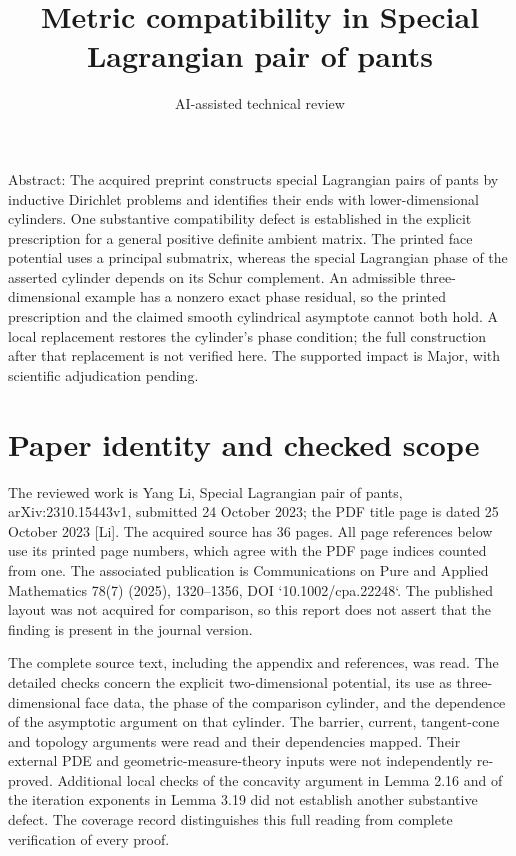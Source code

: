 \documentclass[10pt]{article}
\title{Metric compatibility in
Special Lagrangian pair of pants}
\author{AI-assisted technical review}
\date{}
\begin{document}
\maketitle
Abstract: The acquired preprint constructs special Lagrangian pairs of pants by inductive Dirichlet problems and identifies their ends with lower-dimensional cylinders. One substantive compatibility defect is established in the explicit prescription for a general positive definite ambient matrix. The printed face potential uses a principal submatrix, whereas the special Lagrangian phase of the asserted cylinder depends on its Schur complement. An admissible three-dimensional example has a nonzero exact phase residual, so the printed prescription and the claimed smooth cylindrical asymptote cannot both hold. A local replacement restores the cylinder’s phase condition; the full construction after that replacement is not verified here. The supported impact is Major, with scientific adjudication pending.\par
\section*{Paper identity and checked scope}
The reviewed work is Yang Li, Special Lagrangian pair of pants, arXiv:2310.15443v1, submitted 24 October 2023; the PDF title page is dated 25 October 2023 [Li]. The acquired source has 36 pages. All page references below use its printed page numbers, which agree with the PDF page indices counted from one. The associated publication is Communications on Pure and Applied Mathematics 78(7) (2025), 1320–1356, DOI `10.1002/cpa.22248`. The published layout was not acquired for comparison, so this report does not assert that the finding is present in the journal version.\par
The complete source text, including the appendix and references, was read. The detailed checks concern the explicit two-dimensional potential, its use as three-dimensional face data, the phase of the comparison cylinder, and the dependence of the asymptotic argument on that cylinder. The barrier, current, tangent-cone and topology arguments were read and their dependencies mapped. Their external PDE and geometric-measure-theory inputs were not independently re-proved. Additional local checks of the concavity argument in Lemma 2.16 and of the iteration exponents in Lemma 3.19 did not establish another substantive defect. The coverage record distinguishes this full reading from complete verification of every proof.\par
\end{document}

